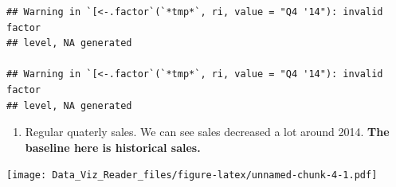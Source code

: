 \documentclass[]{book}
\newenvironment{Shaded}{\begin{snugshade}}{\end{snugshade}}
\newcommand{\KeywordTok}[1]{\textcolor[rgb]{0.13,0.29,0.53}{\textbf{#1}}}
\newcommand{\DataTypeTok}[1]{\textcolor[rgb]{0.13,0.29,0.53}{#1}}
\newcommand{\DecValTok}[1]{\textcolor[rgb]{0.00,0.00,0.81}{#1}}
\newcommand{\FloatTok}[1]{\textcolor[rgb]{0.00,0.00,0.81}{#1}}
\newcommand{\StringTok}[1]{\textcolor[rgb]{0.31,0.60,0.02}{#1}}
\newcommand{\CommentTok}[1]{\textcolor[rgb]{0.56,0.35,0.01}{\textit{#1}}}
\newcommand{\OtherTok}[1]{\textcolor[rgb]{0.56,0.35,0.01}{#1}}
\newcommand{\OperatorTok}[1]{\textcolor[rgb]{0.81,0.36,0.00}{\textbf{#1}}}
\newcommand{\NormalTok}[1]{#1}
\providecommand{\tightlist}{%
  \setlength{\itemsep}{0pt}\setlength{\parskip}{0pt}}
\theoremstyle{definition}
\theoremstyle{definition}
\theoremstyle{definition}
\theoremstyle{remark}
\begin{document}
\begin{verbatim}
## Warning in `[<-.factor`(`*tmp*`, ri, value = "Q4 '14"): invalid factor
## level, NA generated

## Warning in `[<-.factor`(`*tmp*`, ri, value = "Q4 '14"): invalid factor
## level, NA generated
\end{verbatim}

\begin{Shaded}
\end{Shaded}

\begin{enumerate}
\def\labelenumi{\arabic{enumi}.}
\tightlist
\item
  Regular quaterly sales. We can see sales decreased a lot around 2014.
  \textbf{The baseline here is historical sales.}
\end{enumerate}

\begin{Shaded}
\end{Shaded}

\texttt{[image: Data\_Viz\_Reader\_files/figure-latex/unnamed-chunk-4-1.pdf]}
\end{document}
